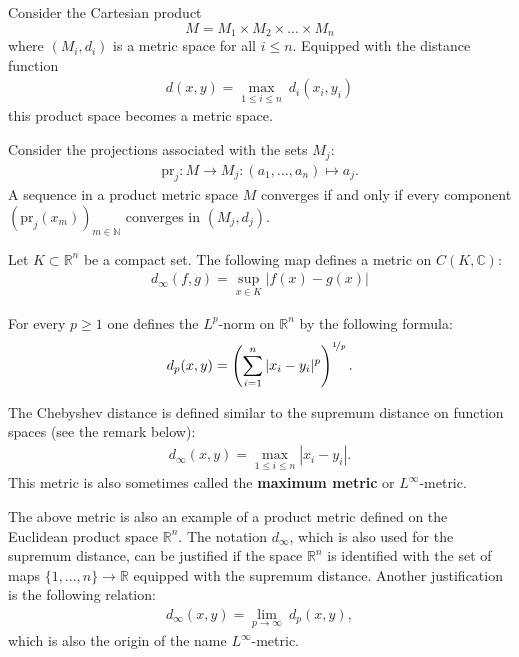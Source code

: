 	\begin{example}
		Consider the Cartesian product \[M = M_1\times M_2\times ... \times M_n\] where $(M_i,d_i)$ is a metric space for all $i\leq n$. Equipped with the distance function
		\begin{gather}
			d(x,y) = \underset{1\leq i\leq n}{\max}\ d_i(x_i,y_i)
		\end{gather}
		this product space becomes a metric space.
	\end{example}
	\begin{property}
		Consider the projections associated with the sets $M_j$:
		\begin{gather}
			\label{metric:projection}
			\text{pr}_j:M\rightarrow M_j:(a_1,...,a_n)\mapsto a_j.
		\end{gather}
		A sequence in a product metric space $M$ converges if and only if every component $(\text{pr}_j(x_m))_{m\in\mathbb{N}}$ converges in $(M_j, d_j)$.
	\end{property}

	\begin{example}
		Let $K\subset\mathbb{R}^n$ be a compact set. The following map defines a metric on $C(K,\mathbb{C})$:
		\begin{gather}
			\label{topology:supremum_distance}
			d_\infty(f,g) = \sup_{x\in K}|f(x) - g(x)|
		\end{gather}
	\end{example}

	\begin{example}[p-metric]
		For every $p\geq1$ one defines the $L^p$-norm on $\mathbb{R}^n$ by the following formula:
		\begin{gather}
			\label{topology:p_metric}
			d_p(x,y) = \left(\sum_{i=1}^n|x_i-y_i|^p\right)^{\nicefrac{1}{p}}.
		\end{gather}
	\end{example}
        \begin{example}
        	The Chebyshev distance is defined similar to the supremum distance on function spaces (see the remark below):
		\begin{gather}
        	    	\label{topology:chebyshev_distance}
        	    	d_\infty(x,y) = \max_{1\leq i\leq n}|x_i - y_i|.
		\end{gather}
            	This metric is also sometimes called the \textbf{maximum metric} or $L^\infty$-metric.
	\end{example}
        \begin{remark}
        	The above metric is also an example of a product metric defined on the Euclidean product space $\mathbb{R}^n$. The notation $d_\infty$, which is also used for the supremum distance, can be justified if the space $\mathbb{R}^n$ is identified with the set of maps $\{1,...,n\}\rightarrow \mathbb{R}$ equipped with the supremum distance. Another justification is the following relation:
		\begin{gather}
			d_\infty(x,y) = \lim_{p\rightarrow\infty}\ d_p(x,y),
		\end{gather}
		which is also the origin of the name $L^\infty$-metric.
        \end{remark}

